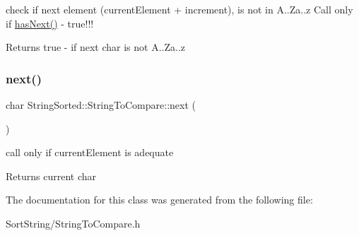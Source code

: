 check if next element (current\+Element + increment), is not in A..Za..z Call only if \hyperlink{classStringSorted_1_1StringToCompare_ab0e3d5662e01e96218838e24c4f70f04}{has\+Next()} -\/ true!!! \begin{DoxyReturn}{Returns}
true -\/ if next char is not A..Za..z 
\end{DoxyReturn}
\mbox{\label{classStringSorted_1_1StringToCompare_ac95630111cf77e6c725364bfeb26f8bc}} 
\subsubsection{\texorpdfstring{next()}{next()}}
{\footnotesize\ttfamily char String\+Sorted\+::\+String\+To\+Compare\+::next (\begin{DoxyParamCaption}{ }\end{DoxyParamCaption})}

call only if current\+Element is adequate \begin{DoxyReturn}{Returns}
current char 
\end{DoxyReturn}


The documentation for this class was generated from the following file\+:\begin{DoxyCompactItemize}
\item 
Sort\+String/String\+To\+Compare.\+h\end{DoxyCompactItemize}

